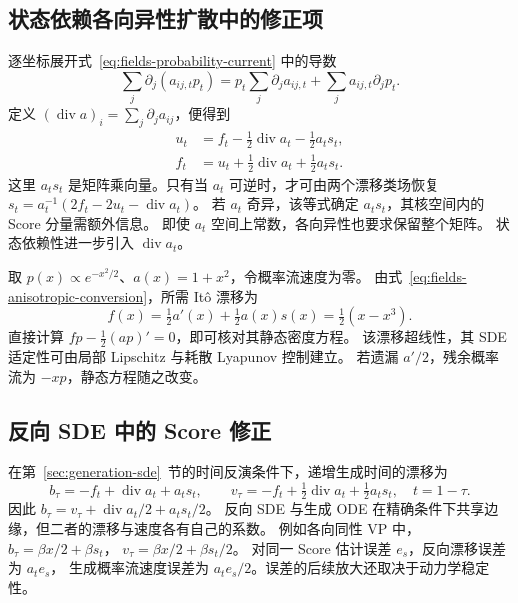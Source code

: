 \subsection{状态依赖各向异性扩散中的修正项\requiredderivation}
\label{subsec:anisotropic-current}

逐坐标展开式~\eqref{eq:fields-probability-current} 中的导数
\[
 \sum_j\partial_j(a_{ij,t}p_t)
 =p_t\sum_j\partial_j a_{ij,t}+\sum_j a_{ij,t}\partial_jp_t.
\]
定义 \((\operatorname{div}a)_i=\sum_j\partial_ja_{ij}\)，便得到
\begin{equation}
 \begin{aligned}
 u_t&=f_t-\tfrac12\operatorname{div}a_t-\tfrac12a_ts_t,\\
 f_t&=u_t+\tfrac12\operatorname{div}a_t+\tfrac12a_ts_t.
 \end{aligned}
 \label{eq:fields-anisotropic-conversion}
\end{equation}
这里 \(a_ts_t\) 是矩阵乘向量。只有当 \(a_t\) 可逆时，才可由两个漂移类场恢复
\(s_t=a_t^{-1}(2f_t-2u_t-\operatorname{div}a_t)\)。
若 \(a_t\) 奇异，该等式确定 \(a_ts_t\)，其核空间内的 Score 分量需额外信息。
即使 \(a_t\) 空间上常数，各向异性也要求保留整个矩阵。
状态依赖性进一步引入 \(\operatorname{div}a_t\)。

\begin{example}[一维乘性扩散中的稳态流]
取 \(p(x)\propto e^{-x^2/2}\)、\(a(x)=1+x^2\)，令概率流速度为零。
由式~\eqref{eq:fields-anisotropic-conversion}，所需 It\^o 漂移为
\[
 f(x)=\tfrac12a'(x)+\tfrac12a(x)s(x)=\tfrac12(x-x^3).
\]
直接计算 \(f p-\frac12(ap)'=0\)，即可核对其静态密度方程。
该漂移超线性，其 SDE 适定性可由局部 Lipschitz 与耗散 Lyapunov 控制建立。
若遗漏 \(a'/2\)，残余概率流为 \(-xp\)，静态方程随之改变。
\end{example}

\subsection{反向 SDE 中的 Score 修正}

在第~\ref{sec:generation-sde}~节的时间反演条件下，递增生成时间的漂移为
\begin{equation}
 b_\tau=-f_t+\operatorname{div}a_t+a_ts_t,\qquad
 v_\tau=-f_t+\tfrac12\operatorname{div}a_t+\tfrac12a_ts_t,
 \quad t=1-\tau.
 \label{eq:fields-reverse-conversion}
\end{equation}
因此 \(b_\tau=v_\tau+\operatorname{div}a_t/2+a_ts_t/2\)。
反向 SDE 与生成 ODE 在精确条件下共享边缘，但二者的漂移与速度各有自己的系数。
例如各向同性 VP 中，\(b_\tau=\beta x/2+\beta s_t\)，
\(v_\tau=\beta x/2+\beta s_t/2\)。
对同一 Score 估计误差 \(e_s\)，反向漂移误差为 \(a_te_s\)，
生成概率流速度误差为 \(a_te_s/2\)。误差的后续放大还取决于动力学稳定性。


